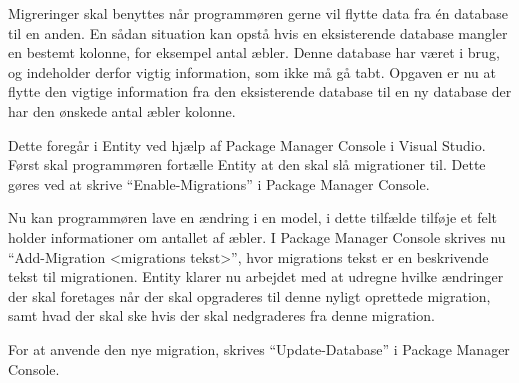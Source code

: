 Migreringer skal benyttes når programmøren gerne vil flytte data fra én database til en anden. En sådan situation kan opstå hvis en eksisterende database mangler en bestemt kolonne, for eksempel antal æbler. Denne database har været i brug, og indeholder derfor vigtig information, som ikke må gå tabt. Opgaven er nu at flytte den vigtige information fra den eksisterende database til en ny database der har den ønskede antal æbler kolonne.

Dette foregår i Entity ved hjælp af Package Manager Console i Visual Studio. Først skal programmøren fortælle Entity at den skal slå migrationer til. Dette gøres ved at skrive \enquote{Enable-Migrations} i Package Manager Console.

Nu kan programmøren lave en ændring i en model, i dette tilfælde tilføje et felt holder informationer om antallet af æbler. I Package Manager Console skrives nu \enquote{Add-Migration <migrations tekst>}, hvor migrations tekst er en beskrivende tekst til migrationen. Entity klarer nu arbejdet med at udregne hvilke ændringer der skal foretages når der skal opgraderes til denne nyligt oprettede migration, samt hvad der skal ske hvis der skal nedgraderes fra denne migration.

For at anvende den nye migration, skrives \enquote{Update-Database} i Package Manager Console.
